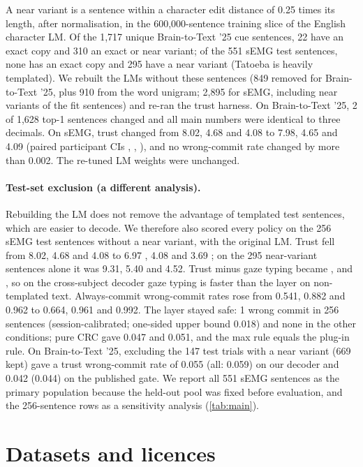 A near variant is a sentence within a character edit distance of 0.25 times its length, after normalisation, in the 600,000-sentence training slice of the English character LM. Of the 1,717 unique Brain-to-Text '25 cue sentences, 22 have an exact copy and 310 an exact or near variant; of the 551 sEMG test sentences, none has an exact copy and 295 have a near variant (Tatoeba is heavily templated). We rebuilt the LMs without these sentences (849 removed for Brain-to-Text '25, plus 910 from the word unigram; 2,895 for sEMG, including near variants of the fit sentences) and re-ran the trust harness. On Brain-to-Text '25, 2 of 1,628 top-1 sentences changed and all main numbers were identical to three decimals. On sEMG, trust \ewpm{} changed from 8.02, 4.68 and 4.08 to 7.98, 4.65 and 4.09 (paired participant CIs , , ), and no wrong-commit rate changed by more than 0.002. The re-tuned LM weights were unchanged.

\paragraph{Test-set exclusion (a different analysis).} Rebuilding the LM does not remove the advantage of templated test sentences, which are easier to decode. We therefore also scored every policy on the 256 sEMG test sentences without a near variant, with the original LM. Trust \ewpm{} fell from 8.02, 4.68 and 4.08 to 6.97 , 4.08  and 3.69 ; on the 295 near-variant sentences alone it was 9.31, 5.40 and 4.52. Trust minus gaze typing became ,  and , so on the cross-subject decoder gaze typing is faster than the layer on non-templated text. Always-commit wrong-commit rates rose from 0.541, 0.882 and 0.962 to 0.664, 0.961 and 0.992. The layer stayed safe: 1 wrong commit in 256 sentences (session-calibrated; one-sided upper bound 0.018) and none in the other conditions; pure CRC gave 0.047 and 0.051, and the max rule equals the plug-in rule. On Brain-to-Text '25, excluding the 147 test trials with a near variant (669 kept) gave a trust wrong-commit rate of 0.055 (all: 0.059) on our decoder and 0.042 (0.044) on the published gate. We report all 551 sEMG sentences as the primary population because the held-out pool was fixed before evaluation, and the 256-sentence rows as a sensitivity analysis (\cref{tab:main}).

\FloatBarrier
\section{Datasets and licences}
\label{app:licences}


